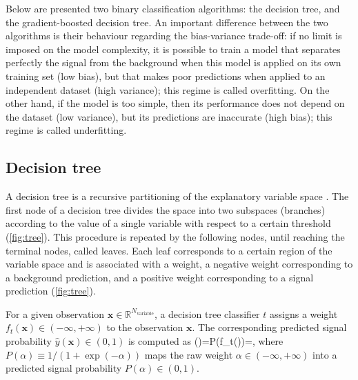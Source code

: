 Below are presented two binary classification algorithms: the decision tree, and the gradient-boosted decision tree.
An important difference between the two algorithms is their behaviour regarding the bias-variance trade-off: if no limit is imposed on the model complexity, it is possible to train a model that separates perfectly the signal from the background when this model is applied on its own training set (low bias), but that makes poor predictions when applied to an independent dataset (high variance); this regime is called overfitting.
On the other hand, if the model is too simple, then its performance does not depend on the dataset (low variance), but its predictions are inaccurate (high bias); this regime is called underfitting.

\subsection{Decision tree}
A decision tree is a recursive partitioning of the explanatory variable space \cite{hastie01statisticallearning}.
The first node of a decision tree divides the space into two subspaces (branches) according to the value of a single variable with respect to a certain threshold (\cref{fig:tree}).
This procedure is repeated by the following nodes, until reaching the terminal nodes, called leaves.
Each leaf corresponds to a certain region of the variable space and is associated with a weight, a negative weight corresponding to a background prediction, and a positive weight corresponding to a signal prediction (\cref{fig:tree}).


For a given observation $\mathbf{x}\in\mathbb{R}^{N_{\mathrm{variable}}}$, a decision tree classifier $t$ assigns a weight $f_t(\mathbf{x})\in(-\infty,+\infty)$ to the observation $\mathbf{x}$.
The corresponding predicted signal probability $\hat{y}(\mathbf{x})\in(0,1)$ is computed as 
\be \label{eq:map_into_probability}
()=P\left(f_t()\right)=,
\ee
where $P(\alpha)\equiv 1/(1+\exp(-\alpha))$ maps the raw weight $\alpha\in(-\infty,+\infty)$ into a predicted signal probability $P(\alpha)\in(0,1)$.

